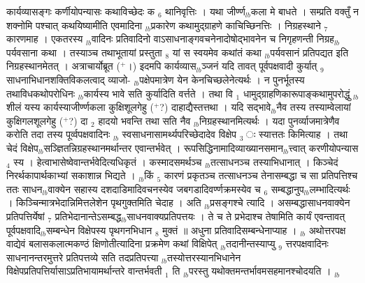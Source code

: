 \documentclass[article,12pt,a4paper]{memoir}%
\newcommand{\add}[1]{($^{+}$#1)}
\newcounter{parCount}
\begin{document}
	  
	  \pstart \leavevmode%
	कार्यव्यासङ्गः कर्णीयोपन्यासः कथाविच्छेदः क {\tiny $_{6}$} थानिवृत्तिः । यथा जीर्ण्ण{\tiny $_{lb}$}कला मे बाधते । सम्प्रति वक्तुँ न शक्नोमि पश्चात् कथयिष्यामीति एवमादिना {\tiny $_{lb}$}प्रकारेण कथामुद्ग्राहणे काचिच्छिनत्तिः । निग्रहस्थाने {\tiny $_{7}$} कारणमाह । एकतरस्य {\tiny $_{lb}$}वादिनः प्रतिवादिनो वाऽसाधनाङ्गवचनेनादोषोद्भावनेन च निगृहणन्ती निग्रह{\tiny $_{lb}$}पर्यवसाना कथा । तस्याञ्च तथाभूतायां प्रस्तुता {\tiny $_{8}$} यां स स्वयमेव कथांतं कथा {\tiny $_{lb}$}पर्यवसानं प्रतिपद्यत इति निग्रहस्थानमेतत् । अत्राचार्योब्रूत \add{।} इदमपि कार्यव्यास{\tiny $_{lb}$}ञ्जनं यदि तावत् पूर्वपक्षवादी कुर्यात् {\tiny $_{9}$} \leavevmode{} साधनाभिधानशक्तिविकलत्वाद् व्याजो- {\tiny $_{lb}$}पक्षेपमात्रेण येन केनचिच्छलेनेत्यर्थः । न पुनर्भूतस्य तथाविधकथोपरोधिनः {\tiny $_{lb}$}कार्यस्य भावे सति कुर्यादिति वर्त्तते । तथा वि {\tiny $_{1}$} धामुद्ग्राहणिकारूपाङ्कथामुपरोद्धुं {\tiny $_{lb}$}शीलं यस्य कार्यस्याजीर्ण्णकला कुक्षिशूलगेहु \add{?} दाहाद्यैस्तत्तथा । यदि सद्भावे{\tiny $_{lb}$}नैव तस्य तस्याम्वेलायां कुक्षिगलशूलगेहु \add{?} दा {\tiny $_{2}$} हादयो भवन्ति तथा सति नैव {\tiny $_{lb}$}निग्रहस्थानमित्यर्थः । यदा पुनर्व्याजमात्रेणैव करोति तदा तस्य पूर्व्वपक्षवादिनः {\tiny $_{lb}$} \leavevmode{} स्वसाधनासामर्थ्यपरिच्छेदादेव विक्षेप {\tiny $_{3}$} ः स्यात्ततः किमित्याह । तथा चेदं विक्षेप{\tiny $_{lb}$}सञ्ज्ञितन्निग्रहस्थानमर्थान्तर एवान्तर्भवेत् । रूपसिद्धिनामादिव्याख्यानसमान{\tiny $_{lb}$}त्त्वात् करणीयोपन्यास {\tiny $_{4}$} स्य । हेत्वाभासेष्वेवान्तर्भवेदित्यधिकृतं । कस्मादसमर्थञ्च {\tiny $_{lb}$}तत्साधनञ्च तस्याभिधानात् । किञ्चेदं निरर्थकापार्थकाभ्यां सकाशान्न भिद्यते । {\tiny $_{lb}$}किं {\tiny $_{5}$} कारणं प्रकृतञ्च तत्साधनञ्च तेनासम्बद्धा च सा प्रतिपत्तिश्च ततः साधन{\tiny $_{lb}$}वाक्येन सहास्य दशदाडिमादिवचनस्येव जबगडादिवर्ण्णक्रमस्येव च {\tiny $_{6}$} सम्बद्धानुप{\tiny $_{lb}$}लम्भादित्यर्थः । किञ्चिन्मात्रभेदान्निमित्तलेशेन पृथगुक्तमिति चेदाह । {\color{DodgerBlue3}अति {\tiny $_{lb}$}प्रसङ्गश्चे} त्यादि । असम्बद्धासाधनवाक्येन प्रतिपत्तिर्येषां {\tiny $_{7}$} प्रतिभेदानान्तेऽसम्बद्ध{\tiny $_{lb}$}साधनवाक्यप्रतिपत्तयः । ते च ते प्रभेदाश्च तेषामिति कार्यं एवन्तावत् पूर्वपक्षवादि{\tiny $_{lb}$}सम्बन्धेन विक्षेपस्य पृथगनभिधान {\tiny $_{8}$} मुक्तं ॥ अधुना प्रतिवादिसम्बन्धेनाप्याह । {\tiny $_{lb}$} {\color{DodgerBlue3}अथोत्तरपक्ष} वाद्येवं बलासकलात्मकण्ठं क्षिणोतीत्यादिना प्रक्रमेण कथां विक्षिपेत् {\tiny $_{lb}$}तदानीन्तस्याप्यु {\tiny $_{9}$} \leavevmode{} त्तरपक्षवादिनः साधनानन्तरमुत्तरे प्रतिपत्तव्ये सति तदप्रतिपत्त्या {\tiny $_{lb}$}तस्योत्तरस्यानभिधानेन विक्षेपप्रतिपत्तिर्यासाऽप्रतिभायामर्थान्तरे वान्तर्भवती {\tiny $_{1}$} ति {\tiny $_{lb}$}परस्तु यथोक्तमन्तर्भावमसहमानश्चोदयति ।
	{}
	\pend%
      {\tiny $_{lb}$}
\end{document}
